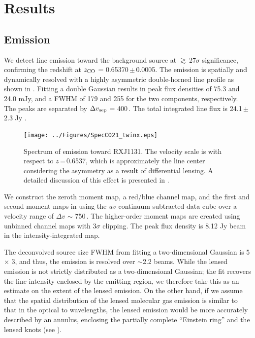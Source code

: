\documentclass[]{emulateapj}
\begin{document}
\section{Results} \label{sec:results}
\subsection{\bco Emission} \label{sec:CO21} %
We detect \bco line emission toward the background source
at $\gtrsim$\,27$\sigma$ significance, confirming the redshift at $z_{\rm CO}$ =
0.65370\,$\pm$\,0.0005. The emission is spatially and dynamically resolved
with a highly asymmetric double-horned line profile
as shown in . Fitting a double Gaussian results in peak
flux densities of 75.3 and 24.0 mJy, and a FWHM of
179 \kms and 255 \kms for the two components, respectively. The peaks are separated by
$\Delta v_{\rm sep}$ = 400\,\kms. The total integrated line flux is 24.1\,$\pm$\,2.3 Jy \kms. %

\begin{figure}[!htbp]
\centering
\texttt{[image: ../Figures/SpecCO21\_twinx.eps]}
\caption{ Spectrum of \bco emission toward RXJ1131. The velocity scale
is with respect to $z$\,=\,0.6537, which is approximately the line center
considering the asymmetry as a result of differential lensing.
A detailed discussion of this effect is presented in
.
 \label{fig:CO21spec}}
\end{figure}

We construct the zeroth moment map, a red/blue channel map, and
the first and second moment maps in 
using the $uv$-continuum subtracted data cube over a velocity range of
$\Delta v$ $\sim$ 750\,\kms.
The higher-order moment maps are created using
unbinned channel maps with 3$\sigma$ clipping.
The peak flux density is 8.12 Jy\,\kms\,beam\pmOne
in the intensity-integrated map.

The deconvolved source size FWHM from fitting a two-dimensional Gaussian
is 5 $\times$ 3,
and thus, the emission is resolved over $\sim$2.2 beams.
While the lensed emission is not strictly distributed as a two-dimensional
Gaussian;
the fit recovers the line intensity enclosed by the emitting
region, we therefore take this as an estimate on the extent of the lensed
emission. On the other hand, if we assume that the spatial distribution of
the lensed molecular gas emission is similar to that in the optical to \nir
wavelengths, the lensed emission would be more accurately described by an
annulus, enclosing the partially complete ``Einstein ring'' and
the lensed knots (see ).
\end{document}
